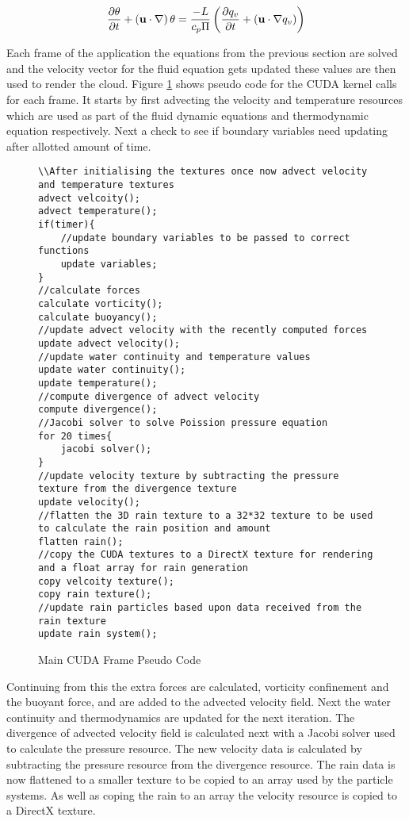 \begin{equation} \label{eq:thermo_meth}
  \centering
  \frac{\partial\theta}{\partial t} + \left(\mathbf{u}\cdot\nabla\right)\theta = \frac{-L}{c_{p}\Pi}\left(\frac{\partial q_{v}}{\partial t} + \left(\mathbf{u\cdot\nabla}q_{v}\right)\right)
\end{equation}

Each frame of the application the equations from the previous section are solved and the velocity vector for the fluid equation gets updated these values are then used to render the cloud.
Figure \ref{sc:UpdateCloudPseudoCode} shows pseudo code for the CUDA kernel calls for each frame.
It starts by first advecting the velocity and temperature resources which are used as part of the fluid dynamic equations and thermodynamic equation respectively.
Next a check to see if boundary variables need updating after allotted amount of time.

\begin{figure}[h]
\centering
\begin{lstlisting}
\\After initialising the textures once now advect velocity and temperature textures
advect velcoity();
advect temperature();
if(timer){
	//update boundary variables to be passed to correct functions
	update variables;
}
//calculate forces
calculate vorticity();
calculate buoyancy();
//update advect velocity with the recently computed forces
update advect velocity();
//update water continuity and temperature values
update water continuity();
update temperature();
//compute divergence of advect velocity
compute divergence();
//Jacobi solver to solve Poission pressure equation
for 20 times{
	jacobi solver();
}
//update velocity texture by subtracting the pressure texture from the divergence texture
update velocity();
//flatten the 3D rain texture to a 32*32 texture to be used to calculate the rain position and amount
flatten rain();
//copy the CUDA textures to a DirectX texture for rendering and a float array for rain generation
copy velcoity texture();
copy rain texture();
//update rain particles based upon data received from the rain texture
update rain system();
\end{lstlisting}
\caption{Main CUDA Frame Pseudo Code}
\label{sc:UpdateCloudPseudoCode}
\end{figure}

Continuing from this the extra forces are calculated, vorticity confinement and the buoyant force, and are added to the advected velocity field.
Next the water continuity and thermodynamics are updated for the next iteration.
The divergence of advected velocity field is calculated next with a Jacobi solver used to calculate the pressure resource.
The new velocity data is calculated by subtracting the pressure resource from the divergence resource.
The rain data is now flattened to a smaller texture to be copied to an array used by the particle systems.
As well as coping the rain to an array the velocity resource is copied to a DirectX texture.

